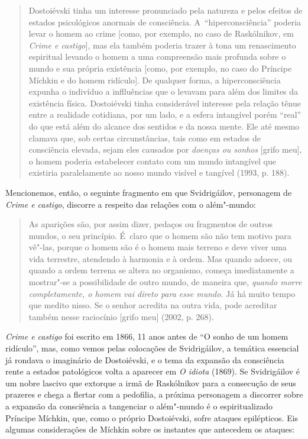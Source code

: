 \begin{quote}
Dostoiévski tinha um interesse pronunciado pela natureza e pelos efeitos
de estados psicológicos anormais de consciência. A~``hiperconsciência''
poderia levar o homem ao crime {[}como, por exemplo, no caso de
Raskólnikov, em \emph{Crime e castigo}{]}, mas ela também poderia trazer
à tona um renascimento espiritual levando o homem a uma compreensão mais
profunda sobre o mundo e sua própria existência {[}como, por exemplo, no
caso do Príncipe Míchkin e do homem ridículo{]}. De qualquer forma, a
hiperconsciência expunha o indivíduo a inflluências que o levavam para
além dos limites da existência física. Dostoiévski tinha considerável
interesse pela relação tênue entre a realidade cotidiana, por um lado, e
a esfera intangível porém ``real'' do que está além do alcance dos
sentidos e da nossa mente. Ele até mesmo clamava que, sob certas
circunstâncias, tais como em estados de consciência elevada, sejam eles
causados por \emph{doenças ou sonhos} {[}grifo meu{]}, o homem poderia
estabelecer contato com um mundo intangível que existiria paralelamente
ao nosso mundo visível e tangível (1993, p. 188).
\end{quote}

Mencionemos, então, o seguinte fragmento em que Svidrigáilov, personagem
de \emph{Crime e castigo}, discorre a respeito das relações com o
além"-mundo:

\begin{quote}
As aparições são, por assim dizer, pedaços ou fragmentos de outros
mundos, o seu princípio. É~claro que o homem são não tem motivo para
vê"-las, porque o homem são é o homem mais terreno e deve viver uma vida
terrestre, atendendo à harmonia e à ordem. Mas quando adoece, ou quando
a ordem terrena se altera no organismo, começa imediatamente a
mostrar"-se a possibilidade de outro mundo, de maneira que, \emph{quando
morre completamente, o homem vai direto para esse mundo.} Já há muito
tempo que medito nisso. Se o senhor acredita na outra vida, pode
acreditar também nesse raciocínio {[}grifo meu{]} (2002, p. 268).
\end{quote}

\emph{Crime e castigo} foi escrito em 1866, 11 anos antes de ``O sonho
de um homem ridículo'', mas, como vemos pelas colocações de
Svidrigáilov, a temática essencial já rondava o imaginário de
Dostoiévski, e o tema da expansão da consciência rente a estados
patológicos volta a aparecer em \emph{O idiota} (1869). Se Svidrigáilov
é um nobre lascivo que extorque a irmã de Raskólnikov para a consecução
de seus prazeres e chega a flertar com a pedofilia, a próxima personagem
a discorrer sobre a expansão da consciência a tangenciar o além"-mundo é
o espiritualizado Príncipe Míchkin, que, como o próprio Dostoiévski,
sofre ataques epilépticos. Eis algumas considerações de Míchkin sobre os
instantes que antecedem os ataques:

